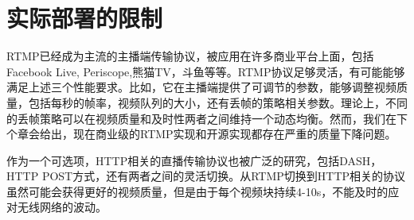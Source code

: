 \section{实际部署的限制}
RTMP已经成为主流的主播端传输协议，被应用在许多商业平台上面，包括Facebook Live, Periscope,熊猫TV，斗鱼等等。RTMP协议足够灵活，有可能能够满足上述三个性能要求。比如，它在主播端提供了可调节的参数，能够调整视频质量，包括每秒的帧率，视频队列的大小，还有丢帧的策略相关参数。理论上，不同的丢帧策略可以在视频质量和及时性两者之间维持一个动态均衡。然而，我们在下个章会给出，现在商业级的RTMP实现和开源实现都存在严重的质量下降问题。

作为一个可选项，HTTP相关的直播传输协议也被广泛的研究，包括DASH，HTTP POST方式，还有两者之间的灵活切换。从RTMP切换到HTTP相关的协议虽然可能会获得更好的视频质量，但是由于每个视频块持续4-10s，不能及时的应对无线网络的波动。